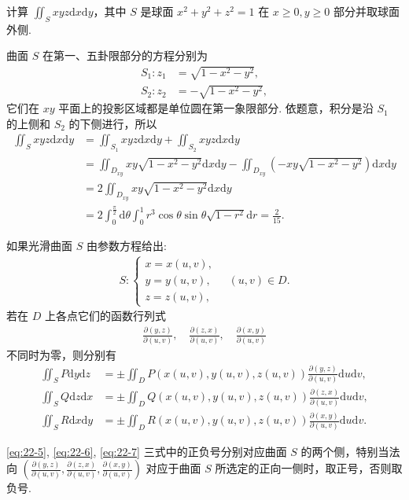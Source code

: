 \documentclass[../../main.tex]{subfiles}%
\begin{document}
\begin{example}
计算 $\iint_S xyz \mathrm{d}x\mathrm{d}y$，其中 $S$ 是球面 $x^2 + y^2 + z^2 = 1$ 在 $x\geqslant 0, y\geqslant 0$ 部分并取球面外侧.
\end{example}
\begin{solution}
曲面 $S$ 在第一、五卦限部分的方程分别为
\begin{align*}
S_1: z_1 &= \sqrt{1 - x^2 - y^2}, \\
S_2: z_2 &= -\sqrt{1 - x^2 - y^2},
\end{align*}
它们在 $xy$ 平面上的投影区域都是单位圆在第一象限部分. 依题意，积分是沿 $S_1$ 的上侧和 $S_2$ 的下侧进行，所以
\begin{align*}
\iint_S xyz \mathrm{d}x\mathrm{d}y &= \iint_{S_1} xyz \mathrm{d}x\mathrm{d}y + \iint_{S_2} xyz \mathrm{d}x\mathrm{d}y \\
&= \iint_{D_{xy}} xy\sqrt{1 - x^2 - y^2} \mathrm{d}x\mathrm{d}y - \iint_{D_{xy}} (-xy\sqrt{1 - x^2 - y^2}) \mathrm{d}x\mathrm{d}y \\
&= 2 \iint_{D_{xy}} xy\sqrt{1 - x^2 - y^2} \mathrm{d}x\mathrm{d}y \\
&= 2 \int_0^{\frac{\pi}{2}} \mathrm{d}\theta \int_0^1 r^3 \cos\theta \sin\theta \sqrt{1 - r^2} \mathrm{d}r = \frac{2}{15}.
\end{align*}
\end{solution}

\begin{proposition}
如果光滑曲面 $S$ 由参数方程给出:
\begin{align*}
S: \begin{cases} x = x(u,v), \\ y = y(u,v), \\ z = z(u,v), \end{cases} \quad (u,v) \in D.
\end{align*}
若在 $D$ 上各点它们的函数行列式
\begin{align*}
\frac{\partial(y,z)}{\partial(u,v)}, \quad \frac{\partial(z,x)}{\partial(u,v)}, \quad \frac{\partial(x,y)}{\partial(u,v)}
\end{align*}
不同时为零，则分别有
\begin{align}
\iint_S P \mathrm{d}y\mathrm{d}z &= \pm \iint_D P(x(u,v), y(u,v), z(u,v)) \frac{\partial(y,z)}{\partial(u,v)} \mathrm{d}u\mathrm{d}v, \label{eq:22-5} \\
\iint_S Q \mathrm{d}z\mathrm{d}x &= \pm \iint_D Q(x(u,v), y(u,v), z(u,v)) \frac{\partial(z,x)}{\partial(u,v)} \mathrm{d}u\mathrm{d}v, \label{eq:22-6} \\
\iint_S R \mathrm{d}x\mathrm{d}y &= \pm \iint_D R(x(u,v), y(u,v), z(u,v)) \frac{\partial(x,y)}{\partial(u,v)} \mathrm{d}u\mathrm{d}v. \label{eq:22-7}
\end{align}
\end{proposition}
\begin{remark}
\eqref{eq:22-5}, \eqref{eq:22-6}, \eqref{eq:22-7} 三式中的正负号分别对应曲面 $S$ 的两个侧，特别当法向 $\left(\frac{\partial(y,z)}{\partial(u,v)}, \frac{\partial(z,x)}{\partial(u,v)}, \frac{\partial(x,y)}{\partial(u,v)}\right)$ 对应于曲面 $S$ 所选定的正向一侧时，取正号，否则取负号.
\end{remark}
\end{document}
